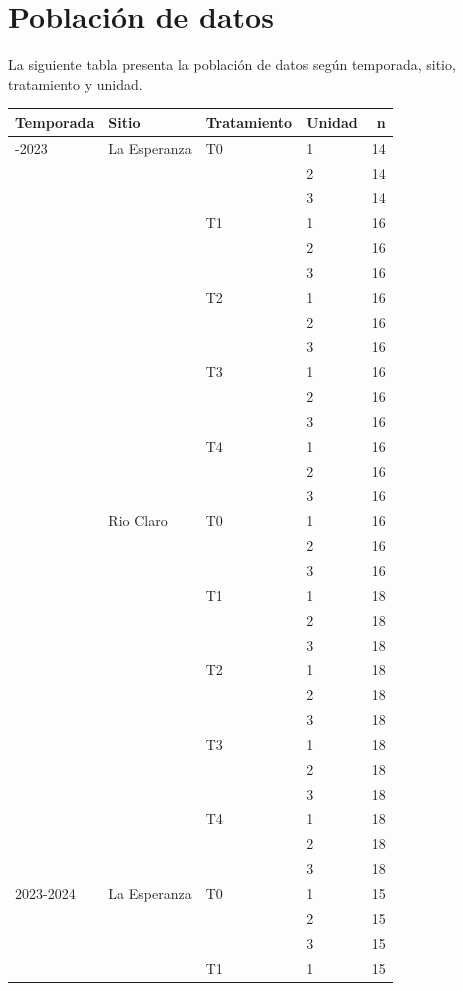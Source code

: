 \documentclass[
  letterpaper,
  DIV=11,
  numbers=noendperiod]{scrreprt}
\begin{document}
\chapter{Población de datos}

La siguiente tabla presenta la población de datos según temporada,
sitio, tratamiento y unidad.

\begin{longtable}[]{@{}llllr@{}}
\toprule\noalign{}
Temporada & Sitio & Tratamiento & Unidad & n \\
\midrule\noalign{}
\endhead
\bottomrule\noalign{}
\endlastfoot
2022-2023 & La Esperanza & T0 & 1 & 14 \\
& & & 2 & 14 \\
& & & 3 & 14 \\
& & T1 & 1 & 16 \\
& & & 2 & 16 \\
& & & 3 & 16 \\
& & T2 & 1 & 16 \\
& & & 2 & 16 \\
& & & 3 & 16 \\
& & T3 & 1 & 16 \\
& & & 2 & 16 \\
& & & 3 & 16 \\
& & T4 & 1 & 16 \\
& & & 2 & 16 \\
& & & 3 & 16 \\
& Rio Claro & T0 & 1 & 16 \\
& & & 2 & 16 \\
& & & 3 & 16 \\
& & T1 & 1 & 18 \\
& & & 2 & 18 \\
& & & 3 & 18 \\
& & T2 & 1 & 18 \\
& & & 2 & 18 \\
& & & 3 & 18 \\
& & T3 & 1 & 18 \\
& & & 2 & 18 \\
& & & 3 & 18 \\
& & T4 & 1 & 18 \\
& & & 2 & 18 \\
& & & 3 & 18 \\
2023-2024 & La Esperanza & T0 & 1 & 15 \\
& & & 2 & 15 \\
& & & 3 & 15 \\
& & T1 & 1 & 15 \\

\end{longtable}
\end{document}
